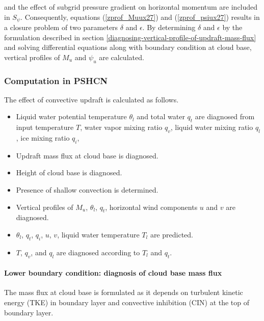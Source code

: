 and the effect of subgrid pressure gradient on horizontal momentum are included in \(S_{\psi}\). Consequently, equations (\ref{zprof_Muux27}{}) and (\ref{zprof_psiux27})
results in a closure problem of two parameters \(\delta\) and \(\epsilon\). By determining \(\delta\) and \(\epsilon\) by the formulation described in section
\ref{diagnosing-vertical-profile-of-updraft-mass-flux} and solving differential equations along with boundary condition at cloud base, vertical profiles of \(M_u\) and \(\psi_u\) are
calculated.

\hypertarget{computation-in-PSHCN}{%
\subsubsection{Computation in PSHCN}\label{computation-in-PSHCN}}

The effect of convective updraft is calculated as follows.

\begin{itemize}
\item
  Liquid water potential temperature \(\theta_l\) and total water \(q_t\) are diagnosed from input temperature \(T\), water vapor mixing ratio \(q_v\), liquid water mixing ratio \(q_l\), ice mixing
  ratio \(q_i\),
\item
  Updraft mass flux at cloud base is diagnosed.
\item
  Height of cloud base is diagnosed.
\item
  Presence of shallow convection is determined.
\item
  Vertical profiles of \(M_u\), \(\theta_l\), \(q_t\), horizontal wind components \(u\) and \(v\) are diagnosed.
\item
  \(\theta_l\), \(q_t\), \(q_i\), \(u\), \(v\), liquid water temperature \(T_l\) are predicted.
\item
  \(T\), \(q_v\), and \(q_l\) are diagnosed according to \(T_l\) and \(q_t\).
\end{itemize}

\hypertarget{lower-boundary-condition}{%
\paragraph{Lower boundary condition: diagnosis of cloud base mass flux}\label{lower-boundary-condition}}

The mass flux at cloud base is formulated as it depends on turbulent kinetic energy (TKE) in boundary layer and convective inhibition (CIN) at the top of boundary layer.

